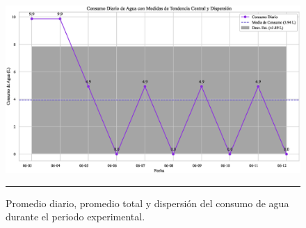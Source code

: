 \documentclass[pdflatex,sn-mathphys-num]{sn-jnl}%
\theoremstyle{thmstyleone}%
\theoremstyle{thmstyletwo}%
\theoremstyle{thmstylethree}%
\begin{document}
\begin{multicols}{2}
\justifying

\end{multicols}
\begin{figure}[!ht]
    \centering
    \includegraphics[width=1\textwidth]{assets/consumo_diario_promedio_y_estadisticas.eps}
    \caption{Promedio diario, promedio total y dispersión del consumo de agua durante el periodo experimental.}
    \label{fig:consumo_estadisticas}

    \vspace{0.4cm}

    \noindent
    \begin{minipage}[t]{0.45\textwidth}
        \justifying
	\end{minipage}%
    \hfill
    \begin{minipage}[t]{0.45\textwidth}
        \justifying

\end{minipage}

    \vspace{0.5cm}
    \hrule
\end{figure}
\newpage
\end{document}
